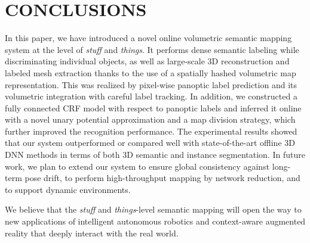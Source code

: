 \documentclass[letterpaper, 10pt, conference]{latex_template/ieeeconf}
\begin{document}
\section{CONCLUSIONS}
In this paper, we have introduced a novel online volumetric semantic mapping system at the level of {\it stuff} and {\it things}.
It performs dense semantic labeling while discriminating individual objects, as well as large-scale 3D reconstruction and labeled mesh extraction thanks to the use of a spatially hashed volumetric map representation.
This was realized by pixel-wise panoptic label prediction and its volumetric integration with careful label tracking.
In addition, we constructed a fully connected CRF model with respect to panoptic labels and inferred it online with a novel unary potential approximation and a map division strategy, which further improved the recognition performance.
The experimental results showed that our system outperformed or compared well with state-of-the-art offline 3D DNN methods in terms of both 3D semantic and instance segmentation.
In future work, we plan to extend our system to ensure global consistency against long-term pose drift, to perform high-throughput mapping by network reduction, and to support dynamic environments.

We believe that the {\it stuff} and {\it things}-level semantic mapping will open the way to new applications of intelligent autonomous robotics and context-aware augmented reality that deeply interact with the real world.

 
\addtolength{\textheight}{-12cm}   






















\end{document}
